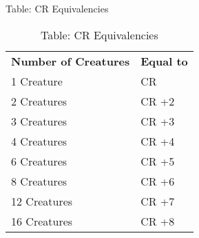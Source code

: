 

Table: CR Equivalencies
\begin{table}[]
\sffamily
\caption{Table: CR Equivalencies}
\begin{tabular}{ll}
\textbf{Number of Creatures} & \textbf{Equal to}\\
1 Creature & CR \\
 2 Creatures & CR +2 \\
 3 Creatures & CR +3 \\
 4 Creatures & CR +4 \\
 6 Creatures & CR +5 \\
 8 Creatures & CR +6 \\
 12 Creatures & CR +7 \\
 16 Creatures & CR +8\\
\end{tabular}
\end{table}

